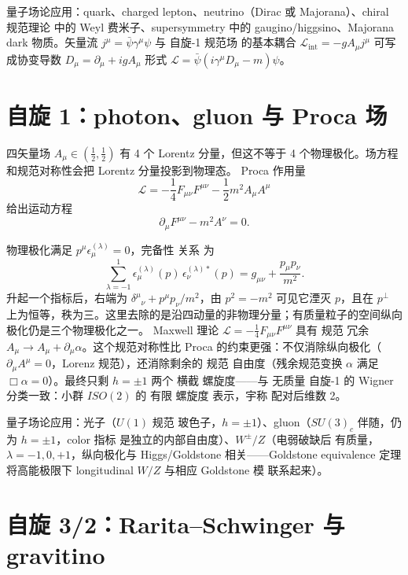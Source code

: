 量子场论应用：quark、charged lepton、neutrino（Dirac 或 Majorana）、chiral 规范理论 中的 Weyl 费米子、supersymmetry 中的 gaugino/higgsino、Majorana dark 物质。矢量流 $j^\mu=\bar\psi\gamma^\mu\psi$ 与 自旋-1 规范场 的基本耦合 $\mathcal{L}_{\text{int}}=-gA_\mu j^\mu$ 可写成协变导数 $D_\mu=\partial_\mu+igA_\mu$ 形式 $\mathcal{L}=\bar\psi(i\gamma^\mu D_\mu-m)\psi$。



\section{自旋 1：photon、gluon 与 Proca 场}

四矢量场 $A_\mu\in(\frac{1}{2},\frac{1}{2})$ 有 4 个 Lorentz 分量，但这不等于 4 个物理极化。场方程和规范对称性会把 Lorentz 分量投影到物理态。
Proca 作用量
\begin{equation}
\mathcal{L}=-\frac{1}{4}F_{\mu\nu}F^{\mu\nu}-\frac{1}{2}m^2 A_\mu A^\mu
\end{equation}
给出运动方程
\begin{equation}
\partial_\mu F^{\mu\nu}-m^2 A^\nu=0.
\end{equation}

物理极化满足 $p^\mu\epsilon_\mu^{(\lambda)}=0$，完备性 关系 为
\begin{equation*}\boxed{
\sum_{\lambda=-1}^{1}\epsilon_\mu^{(\lambda)}(p)\,\epsilon_\nu^{(\lambda)\ast}(p)=g_{\mu\nu}+\frac{p_\mu p_\nu}{m^2}.
}
\end{equation*}
升起一个指标后，右端为 $\delta^\mu{}_{\nu}+p^\mu p_\nu/m^2$，由 $p^2=-m^2$ 可见它湮灭 $p$，且在 $p^\perp$ 上为恒等，秩为三。这里去除的是沿四动量的非物理分量；有质量粒子的空间纵向极化仍是三个物理极化之一。
Maxwell 理论 $\mathcal{L}=-\frac{1}{4}F_{\mu\nu}F^{\mu\nu}$ 具有 规范 冗余 $A_\mu\to A_\mu+\partial_\mu\alpha$。这个规范对称性比 Proca 的约束更强：不仅消除纵向极化（$\partial_\mu A^\mu=0$，Lorenz 规范），还消除剩余的 规范 自由度（残余规范变换 $\alpha$ 满足 $\Box\alpha=0$）。最终只剩 $h=\pm1$ 两个 横截 螺旋度——与 无质量 自旋-1 的 Wigner 分类一致：小群 $ISO(2)$ 的 有限 螺旋度 表示，宇称 配对后维数 2。

量子场论应用：光子（$U(1)$ 规范 玻色子，$h=\pm1$）、gluon（$SU(3)_c$ 伴随，仍为 $h=\pm1$，color 指标 是独立的内部自由度）、$W^\pm/Z$（电弱破缺后 有质量，$\lambda=-1,0,+1$，纵向极化与 Higgs/Goldstone 相关——Goldstone equivalence 定理 将高能极限下 longitudinal $W/Z$ 与相应 Goldstone 模 联系起来）。

\section{自旋 3/2：Rarita--Schwinger 与 gravitino}

